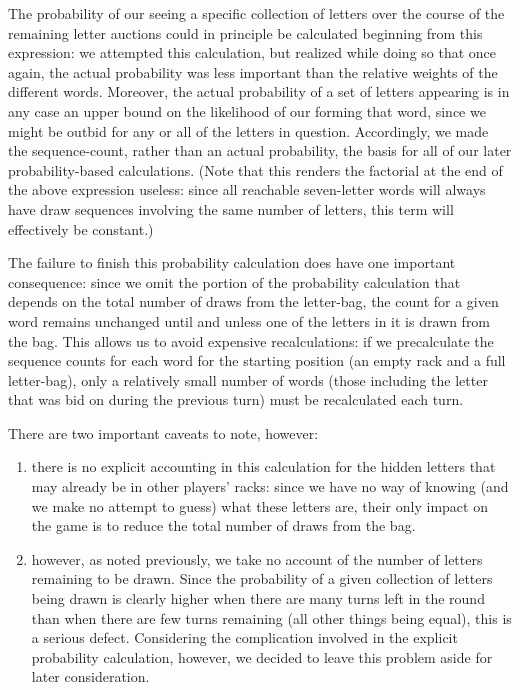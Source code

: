 \documentclass[11pt]{article}
\begin{document}
The probability of our seeing a specific collection of letters over the course of the remaining letter auctions could in principle be calculated beginning from this expression: we attempted this calculation, but realized while doing so that once again, the actual probability was less important than the relative weights of the different words.  Moreover, the actual probability of a set of letters appearing is in any case an upper bound on the likelihood of our forming that word, since we might be outbid for any or all of the letters in question.  Accordingly, we made the sequence-count, rather than an actual probability, the basis for all of our later probability-based calculations.  (Note that this renders the factorial at the end of the above expression useless: since all reachable seven-letter words will always have draw sequences involving the same number of letters, this term will effectively be constant.)

The failure to finish this probability calculation does have one important consequence: since we omit the portion of the probability calculation that depends on the total number of draws from the letter-bag, the count for a given word remains unchanged until and unless one of the letters in it is drawn from the bag.  This allows us to avoid expensive recalculations: if we precalculate the sequence counts for each word for the starting position (an empty rack and a full letter-bag), only a relatively small number of words (those including the letter that was bid on during the previous turn) must be recalculated each turn.

There are two important caveats to note, however:
\begin{enumerate}
\item there is no explicit accounting in this calculation for the hidden letters that may already be in other players' racks: since we have no way of knowing (and we make no attempt to guess) what these letters are, their only impact on the game is to reduce the total number of draws from the bag.
\item however, as noted previously, we take no account of the number of letters remaining to be drawn.  Since the probability of a given collection of letters being drawn is clearly higher when there are many turns left in the round than when there are few turns remaining (all other things being equal), this is a serious defect.  Considering the complication involved in the explicit probability calculation, however, we decided to leave this problem aside for later consideration.
\end{enumerate}
\end{document}
